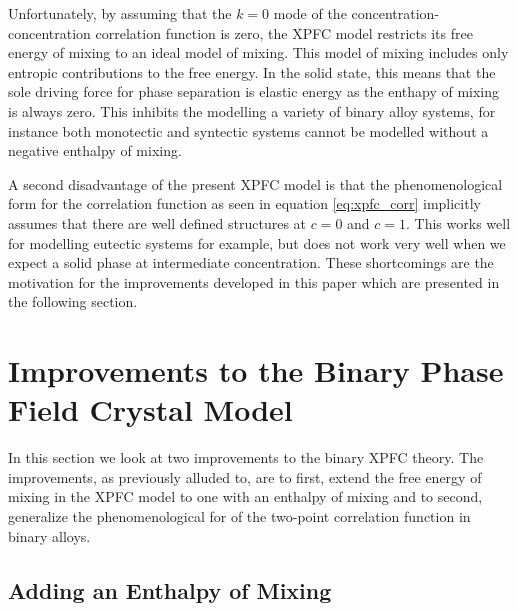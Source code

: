 \documentclass[showkeys, prb, reprint]{revtex4-1}
\begin{document}
Unfortunately, by assuming that the $k=0$ mode of the
concentration-concentration correlation function is zero, the XPFC model
restricts its free energy of mixing to an ideal model of mixing. This model of
mixing includes only entropic contributions to the free energy. In the solid
state, this means that the sole driving force for phase separation is elastic
energy as the enthapy of mixing is always zero. This inhibits the modelling a
variety of binary alloy systems, for instance both monotectic and syntectic
systems cannot be modelled without a negative enthalpy of mixing. 

A second disadvantage of the present XPFC model is that the phenomenological
form for the correlation function as seen in equation \ref{eq:xpfc_corr}
implicitly assumes that there are well defined structures at $c=0$ and $c=1$.
This works well for modelling eutectic systems for example, but does not work
very well when we expect a solid phase at intermediate concentration. These
shortcomings are the motivation for the improvements developed in this paper
which are presented in the following section.

\section{Improvements to the Binary Phase Field Crystal Model} %
\label{sec:improvements}

In this section we look at two improvements to the binary XPFC theory. The
improvements, as previously alluded to, are to first, extend the free energy of
mixing in the XPFC model to one with an enthalpy of mixing and to second,
generalize the phenomenological for of the two-point correlation function in
binary alloys.

\subsection{Adding an Enthalpy of Mixing} %
\end{document}
